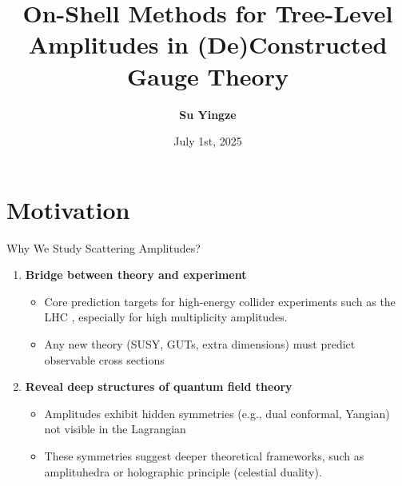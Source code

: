 \documentclass{beamer}
\title[Application of BCFW]{\Large On-Shell Methods for Tree-Level Amplitudes in (De)Constructed Gauge Theory}
\author[Su Yingze]{
  \textbf{Su Yingze}
}
\institute[E Lab]{
  \normalsize E Lab, Nagoya University
}
\date[$1^{\text{st}}$ July]{July 1st, 2025}
\begin{document}
\begin{frame} %
  \titlepage
\end{frame}
\section{Motivation}
\begin{frame}{Why We Study Scattering Amplitudes?}
  \begin{enumerate}
    \item \textbf{Bridge between theory and experiment}
    \begin{itemize}
      \item Core prediction targets for high-energy collider experiments such as the LHC , especially for high multiplicity amplitudes.
      \item Any new theory (SUSY, GUTs, extra dimensions) must predict observable cross sections
    \end{itemize}
    \pause
    \item \textbf{Reveal deep structures of quantum field theory}
    \begin{itemize}
      \item Amplitudes exhibit hidden symmetries (e.g., dual conformal, Yangian) not visible in the Lagrangian
      \item These symmetries suggest deeper theoretical frameworks, such as amplituhedra or holographic principle (celestial duality).
    \end{itemize}
  \end{enumerate}
\end{frame}
\end{document}
